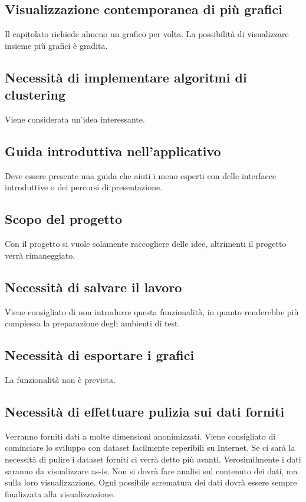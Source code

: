 \documentclass{article}
\begin{document}
    \subsection{Visualizzazione contemporanea di più grafici}
    \label{sub:domanda_04}
    Il capitolato richiede almeno un grafico per volta. La possibilità di visualizzare insieme più grafici è gradita.

    \subsection{Necessità di implementare algoritmi di clustering}
    \label{sub:domanda_05}
    Viene considerata un'idea interessante.

    \subsection{Guida introduttiva nell'applicativo}
    \label{sub:domanda_06}
    Deve essere presente una guida che aiuti i meno esperti con delle interfacce introduttive o dei percorsi di presentazione.

    \subsection{Scopo del progetto}
    \label{sub:domanda_07}
    Con il progetto si vuole solamente raccogliere delle idee, altrimenti il progetto verrà rimaneggiato.

    \subsection{Necessità di salvare il lavoro}
    \label{sub:domanda_08}
    Viene consigliato di non introdurre questa funzionalità, in quanto renderebbe più complessa la preparazione degli ambienti di test.
    
    \subsection{Necessità di esportare i grafici}
    \label{sub:domanda_09}
    La funzionalità non è prevista.
    
    \subsection{Necessità di effettuare pulizia sui dati forniti}
    \label{sub:domanda_10}
    Verranno forniti dati a molte dimensioni anonimizzati. Viene consigliato di cominciare lo sviluppo con dataset facilmente reperibili su Internet. Se ci sarà la necessità di pulire i dataset forniti ci verrà detto più avanti. Verosimilmente i dati saranno da visualizzare as-is. Non si dovrà fare analisi sul contenuto dei dati, ma sulla loro visualizzazione. Ogni possibile scrematura dei dati dovrà essere sempre finalizzata alla visualizzazione.
\end{document}
